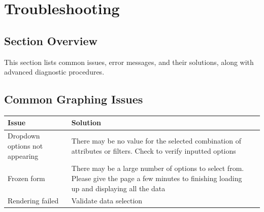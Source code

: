 \documentclass[12pt]{article}
\begin{document}
\section{Troubleshooting}
\subsection*{Section Overview}
This section lists common issues, error messages, and their solutions, along
with advanced diagnostic procedures.

\subsection{Common Graphing Issues}

\begin{table}[H]
    \centering
    \begin{tabularx}{\textwidth}{lXl}
        \toprule
        \textbf{Issue} & \textbf{Solution} \\
        \midrule
        Dropdown options not appearing & There may be no value for the
        selected combination of attributes or filters. Check to verify inputted
        options \newline \\
        Frozen form & There may be a large number of options to select from.
        Please give the page a few minutes to finishing loading up and
        displaying all the data \newline \\
        Rendering failed & Validate data selection \\
        \bottomrule
    \end{tabularx}
\end{table}
\end{document}
